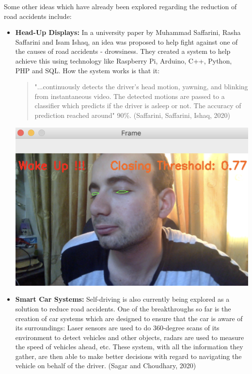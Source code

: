 \documentclass[12pt, a4paper]{article}
\begin{document}
Some other ideas which have already been explored regarding the reduction of road accidents include: 
\begin{itemize}
    \item \textbf{Head-Up Displays:} In a university paper by Muhammad Saffarini, Rasha Saffarini and Isam Ishaq, an idea was proposed to help fight against one of the causes of road accidents - drowsiness. They created a system to help achieve this using technology like Raspberry Pi, Arduino, C++, Python, PHP and SQL. How the system works is that it: 
    \begin{quote}    
        "...continuously detects the driver's head motion, yawning, and blinking from instantaneous video. The detected motions are passed to a classifier which predicts if the driver is asleep or not. The accuracy of prediction reached around" 90\%. (Saffarini, Saffarini, Ishaq, 2020)
    \end{quote} 
    \begin{center}
        \includegraphics[width=0.5\linewidth]{The side view of the face and eyes are closed.png}
        \label{fig:side-view-eyes-closed}
    \end{center}
    
    \item\textbf{Smart Car Systems:} Self-driving is also currently being explored as a solution to reduce road accidents. One of the breakthroughs so far is the creation of car systems which are designed to ensure that the car is aware of its surroundings: Laser sensors are used to do 360-degree scans of its environment to detect vehicles and other objects, radars are used to measure the speed of vehicles ahead, etc. These system, with all the information they gather, are then able to make better decisions with regard to navigating the vehicle on behalf of the driver. (Sagar and Choudhary, 2020)
\end{itemize}
\end{document}
